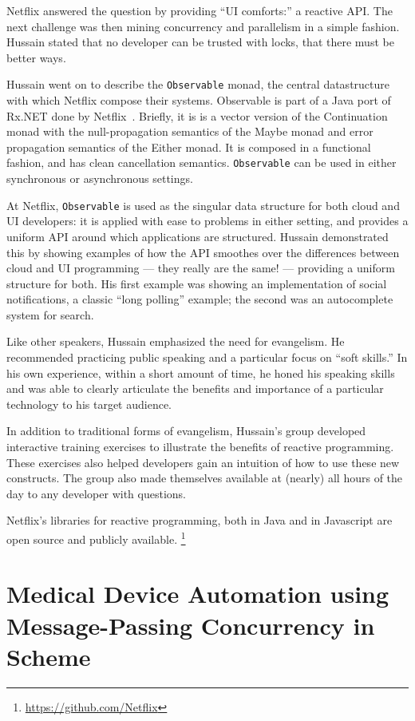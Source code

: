 \documentclass{jfp1}
\begin{document}
Netflix answered the question by providing ``UI comforts:'' a reactive
API. The next challenge was then mining concurrency and
parallelism in a simple fashion.  Hussain stated that no developer can
be trusted with locks, that there must be better ways.

Hussain went on to describe the \texttt{Observable} monad, the central
datastructure with which Netflix compose their systems. Observable is
part of a Java port of Rx.NET done by
Netflix~\cite{Christensen:2013:Reactive}. Briefly, it is is a vector
version of the Continuation monad with the null-propagation semantics
of the Maybe monad and error propagation semantics of the Either
monad. It is composed in a functional fashion, and has clean
cancellation semantics. \texttt{Observable} can be used in either
synchronous or asynchronous settings.

At Netflix, \texttt{Observable} is used as the singular data structure
for both cloud and UI developers: it is applied with ease to problems
in either setting, and provides a uniform API around which
applications are structured. Hussain demonstrated this by showing
examples of how the API smoothes over the differences between cloud
and UI programming --- they really are the same! --- providing a
uniform structure for both. His first example was showing an
implementation of social notifications, a classic ``long polling''
example; the second was an autocomplete system for search.

Like other speakers, Hussain emphasized the need for evangelism.
He recommended practicing public speaking and a particular focus
on ``soft skills.'' In his own experience, within a short amount of time,
he honed his speaking skills and was able to clearly articulate the
benefits and importance of a particular technology to his target 
audience.

In addition to traditional forms of evangelism, Hussain's group
developed interactive training exercises to illustrate the benefits
of reactive programming. These exercises also helped developers gain
an intuition of how to use these new constructs. The group  also made
themselves available at (nearly) all hours of the day to any developer
with questions.

Netflix's libraries for reactive programming, both in Java and in 
Javascript are open source and publicly available.
\footnote{\url{https://github.com/Netflix}}

\section{Medical Device Automation using Message-Passing 
Concurrency in Scheme}
\end{document}
